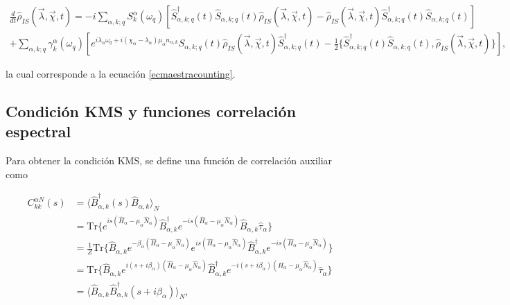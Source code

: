 \begin{appendixs}
\begin{multline*}
    \frac{d}{dt}\hat{\rho}_{IS}(\vec{\lambda},\vec{\chi},t) = - i \sum_{\alpha,k;q}S^{\alpha}_{k}(\omega_{q})\left[\hat{S}^{\dagger}_{\alpha,k;q}(t)\hat{S}_{\alpha,k;q}(t)\hat{\rho}_{IS}(\vec{\lambda},\vec{\chi},t) - \hat{\rho}_{IS}(\vec{\lambda},\vec{\chi},t)\hat{S}^{\dagger}_{\alpha,k;q}(t)\hat{S}_{\alpha,k;q}(t) \right] \\
    + \sum_{\alpha,k;q} \gamma_{k}^{\alpha}(\omega_{q})\left[ e^{i\lambda_{\alpha}\omega_{q}+ i(\chi_{\alpha} - \lambda_{\alpha})\mu_{\alpha}n_{\alpha,k}}\hat{S}_{\alpha,k;q}(t)\hat{\rho}_{IS}(\vec{\lambda},\vec{\chi},t)\hat{S}^{\dagger}_{\alpha,k;q}(t) - \frac{1}{2}\{\hat{S}^{\dagger}_{\alpha,k;q}(t)\hat{S}_{\alpha,k;q}(t),\hat{\rho}_{IS}(\vec{\lambda},\vec{\chi},t) \} \right],
\end{multline*}

la cual corresponde a la ecuación \eqref{ecmaestracounting}.

\label{apendixGKLSgeneral}





\subsection{Condición KMS y funciones correlación espectral}

Para obtener la condición KMS, se define una función de correlación auxiliar como

\begin{align*}
    C^{\alpha N}_{kk}(s) & =  \langle \hat{B}^{\dagger}_{\alpha,k}(s)\hat{B}_{\alpha,k} \rangle_{N} \\
   &  = \text{Tr}\{e^{is(\hat{H}_{\alpha} - \mu_{\alpha}\hat{N}_{\alpha})}\hat{B}^{\dagger}_{\alpha,k}e^{-is(\hat{H}_{\alpha} - \mu_{\alpha}\hat{N}_{\alpha})}\hat{B}_{\alpha,k}\hat{\tau}_{\alpha}  \} \\
   & = \frac{1}{Z}\text{Tr}\{\hat{B}_{\alpha,k} e^{-\beta_{\alpha}(\hat{H}_{\alpha} - \mu_{\alpha}\hat{N}_{\alpha})} e^{is(\hat{H}_{\alpha} - \mu_{\alpha}\hat{N}_{\alpha})}\hat{B}^{\dagger}_{\alpha,k}e^{-is(\hat{H}_{\alpha} - \mu_{\alpha}\hat{N}_{\alpha})}\} \\
   & = \text{Tr}\{\hat{B}_{\alpha,k}e^{i(s+i\beta_{\alpha})(\hat{H}_{\alpha} - \mu_{\alpha}\hat{N}_{\alpha})}\hat{B}^{\dagger}_{\alpha,k}e^{-i(s+i\beta_{\alpha})(\hat{H}_{\alpha} - \mu_{\alpha}\hat{N}_{\alpha})}\hat{\tau}_{\alpha} \} \\
   & = \langle \hat{B}_{\alpha,k} \hat{B}^{\dagger}_{\alpha,k}(s+i\beta_{\alpha})\rangle_{N},
\end{align*}


\end{appendixs}
